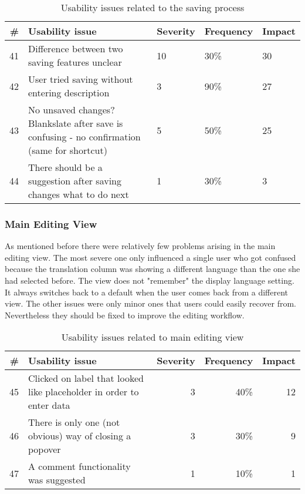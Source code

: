 \begin{table}[h!]
\centering
\begin{tabular}{|r|p{7cm}|l|l|l|}
\hline
\rowcolor[HTML]{EFEFEF}
{\bf \#} & {\bf Usability issue} & {\bf Severity} & {\bf Frequency} & {\bf Impact} \\ \hline
41 & Difference between two saving features unclear & 10 & 30\% & 30 \\ \hline
42 & User tried saving without entering description & 3 & 90\% & 27 \\ \hline
43 & No unsaved changes? Blankslate after save is confusing - no confirmation (same for shortcut) & 5 & 50\% & 25 \\ \hline
44 & There should be a suggestion after saving changes what to do next & 1 & 30\% & 3 \\ \hline
\end{tabular}
\caption{Usability issues related to the saving process}
\label{table:issues-saving}
\end{table}

\subsubsection{Main Editing View}
As mentioned before there were relatively few problems arising in the main editing view. The most severe one only influenced a single user who got confused because the translation column was showing a different language than the one she had selected before. The view does not "remember" the display language setting. It always switches back to a default when the user comes back from a different view. The other issues were only minor ones that users could easily recover from. Nevertheless they should be fixed to improve the editing workflow.


\begin{table}[h!]
\centering
\begin{tabular}{|r|p{7cm}|r|r|r|}
\hline
\rowcolor[HTML]{EFEFEF}
{\bf \#} & {\bf Usability issue} & {\bf Severity} & {\bf Frequency} & {\bf Impact} \\ \hline
45 & Clicked on label that looked like placeholder in order to enter data & 3 & 40\% & 12 \\ \hline
46 & There is only one (not obvious) way of closing a popover & 3 & 30\% & 9 \\ \hline
47 & A comment functionality was suggested & 1 & 10\% & 1 \\ \hline
\end{tabular}
\caption{Usability issues related to main editing view}
\label{table:issues-main-editing-view}
\end{table}

